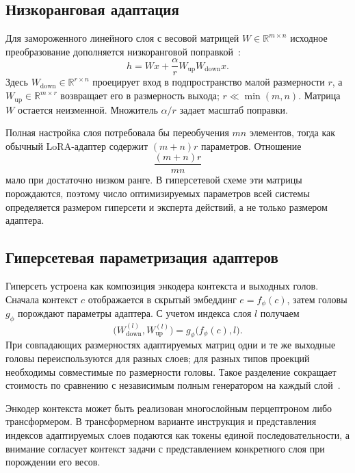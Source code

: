 \documentclass{misisarticle}
\begin{document}
\subsection{Низкоранговая адаптация}

Для замороженного линейного слоя с весовой матрицей $W\in\mathbb{R}^{m\times n}$ исходное преобразование дополняется низкоранговой поправкой~\cite{lora}:
\begin{equation}
  h=Wx+\frac{\alpha}{r}W_{\mathrm{up}}W_{\mathrm{down}}x.
\label{eq:lora}
\end{equation}
Здесь $W_{\mathrm{down}}\in\mathbb{R}^{r\times n}$ проецирует вход в подпространство малой размерности $r$, а $W_{\mathrm{up}}\in\mathbb{R}^{m\times r}$ возвращает его в размерность выхода; $r\ll\min(m,n)$. Матрица $W$ остается неизменной. Множитель $\alpha/r$ задает масштаб поправки.

Полная настройка слоя потребовала бы переобучения $mn$ элементов, тогда как обычный LoRA-адаптер содержит $(m+n)r$ параметров. Отношение
\begin{equation}
  \frac{(m+n)r}{mn}
\end{equation}
мало при достаточно низком ранге. В гиперсетевой схеме эти матрицы порождаются, поэтому число оптимизируемых параметров всей системы определяется размером гиперсети и эксперта действий, а не только размером адаптера.

\subsection{Гиперсетевая параметризация адаптеров}

Гиперсеть устроена как композиция энкодера контекста и выходных голов. Сначала контекст $c$ отображается в скрытый эмбеддинг $e=f_\phi(c)$, затем головы $g_\phi$ порождают параметры адаптера. С учетом индекса слоя $l$ получаем
\begin{equation}
  \bigl(W_{\mathrm{down}}^{(l)},W_{\mathrm{up}}^{(l)}\bigr)
  =g_\phi\bigl(f_\phi(c),l\bigr).
\label{eq:hyper}
\end{equation}
При совпадающих размерностях адаптируемых матриц одни и те же выходные головы переиспользуются для разных слоев; для разных типов проекций необходимы совместимые по размерности головы. Такое разделение сокращает стоимость по сравнению с независимым полным генератором на каждый слой~\cite{hyperlora}.

Энкодер контекста может быть реализован многослойным перцептроном либо трансформером. В трансформерном варианте инструкция и представления индексов адаптируемых слоев подаются как токены единой последовательности, а внимание согласует контекст задачи с представлением конкретного слоя при порождении его весов.
\end{document}
